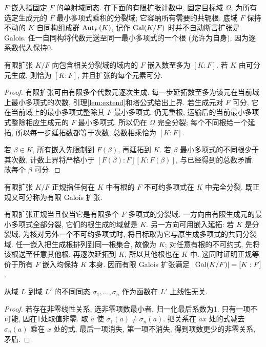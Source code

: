 $F$ 嵌入指固定 $F$ 的单射域同态. 在下面的有限扩张计数中, 固定目标域 $\Omega$, 为所有选定生成元的 $F$ 最小多项式乘积的分裂域; 它容纳所有需要的共轭根.
底域 $F$ 保持不动的 $K$ 自同构组成群 $\operatorname{Aut}_F(K)$, 记作 $\operatorname{Gal}(K/F)$ 时并不自动断言扩张是 Galois. 任一自同构将代数元送至同一最小多项式的一个根 (允许为自身), 因为逐系数代入保持0.
\begin{proposition}\label{prop:embeddings}
有限扩张 $K/F$ 向包含相关分裂域的域内的 $F$ 嵌入数至多为 $[K:F]$. 若 $K$ 由可分元生成, 则恰为 $[K:F]$, 并且扩张的每个元素可分.
\end{proposition}
\begin{proof}
有限扩张可由有限多个代数元逐次生成. 每一步延拓数至多为该元在当前域上最小多项式的次数, 引理\ref{lem:extend}和塔公式给出上界. 若生成元对 $F$ 可分, 它在当前域上的最小多项式整除其 $F$ 最小多项式, 仍无重根, 运输后的当前最小多项式整除相应生成元的 $F$ 最小多项式, 所以仍在 $\Omega$ 完全分裂; 每个不同根给一个延拓, 所以每一步延拓数都等于次数, 总数相乘恰为 $[K:F]$.

若 $\beta\in K$, 所有嵌入先限制到 $F(\beta)$, 再延拓到 $K$. 若 $\beta$ 最小多项式的不同根少于其次数, 计数上界将严格小于 $[F(\beta):F][K:F(\beta)]$, 与已经得到的总数矛盾. 故每个 $\beta$ 可分.
\end{proof}
\begin{definition}
有限扩张 $K/F$ 正规指任何在 $K$ 中有根的 $F$ 不可约多项式在 $K$ 中完全分裂. 既正规又可分称为有限 Galois 扩张.
\end{definition}
有限扩张正规当且仅当它是有限多个 $F$ 多项式的分裂域. 一方向由有限生成元的最小多项式全部分裂, 它们的根生成的域就是 $K$. 另一方向可用嵌入延拓: 若 $K$ 是分裂域, 为核对另外一个不可约多项式时, 将目标取为它与原生成多项式的共同分裂域. 任一嵌入把生成根排列到同一根集合, 故像为 $K$; 对任意有根的不可约式, 先将该根送至任意其他根, 再逐次延拓到 $K$, 所以其他根也在 $K$ 中. 这同时证明正规等价于所有 $F$ 嵌入均保持 $K$ 本身. 因而有限 Galois 扩张满足 $|\operatorname{Gal}(K/F)|=[K:F]$.
\begin{lemma}[不同域同态的独立性]\label{lem:independent}
从域 $L$ 到域 $L'$ 的不同同态 $\sigma_1,\ldots,\sigma_n$ 作为函数在 $L'$ 上线性无关.
\end{lemma}
\begin{proof}
若存在非零线性关系, 选非零项数最小者, 归一化最后系数为1. 只有一项不可能, 因在1处取值非零. 取 $a$ 使 $\sigma_1(a)\ne\sigma_n(a)$. 把关系在 $ax$ 处的式减去 $\sigma_n(a)$ 乘在 $x$ 处的式, 最后一项消失, 第一项不消失, 得到项数更少的非零关系, 矛盾.
\end{proof}
